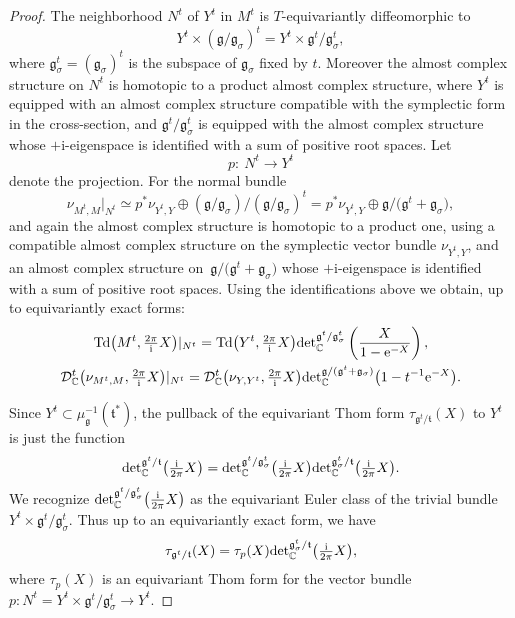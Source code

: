 \documentclass[pdftex]{sigma}
\numberwithin{equation}{section}
\newcommand{\tn}[1]{\textnormal{#1}}
\renewcommand{\i}{{\mathrm{i}}}
\def\g{\ensuremath{\mathfrak{g}}}
\def\t{\ensuremath{\mathfrak{t}}}
\def\bC{\ensuremath{\mathbb{C}}}
\def\Td{\ensuremath{\textnormal{Td}}}
\def\calDC{\ensuremath{\mathcal{D}_{\bC}}}
\def\de{\ensuremath{\tn{det}_\bC}}
\begin{document}
\begin{proof}The neighborhood $N^t$ of $Y^t$ in $M^t$ is $T$-equivariantly diffeomorphic to
\[ Y^t \times (\g/\g_\sigma)^t=Y^t\times \g^t/\g_\sigma^t,\]
where $\g_\sigma^t=(\g_\sigma)^t$ is the subspace of $\g_\sigma$ fixed by $t$. Moreover the almost complex structure on $N^t$ is homotopic to a product almost complex structure, where $Y^t$ is equipped with an almost complex structure compatible with the symplectic form in the cross-section, and $\g^t/\g_\sigma^t$ is equipped with the almost complex structure whose $+\i$-eigenspace is identified with a sum of positive root spaces. Let
\[ p\colon \ N^t \rightarrow Y^t \]
denote the projection. For the normal bundle
\[ \nu_{M^t,M}|_{N^t} \simeq p^\ast \nu_{Y^t,Y}\oplus (\g/\g_\sigma)/(\g/\g_\sigma)^t=p^\ast \nu_{Y^t,Y}\oplus\g/\big(\g^t+\g_\sigma\big),\]
and again the almost complex structure is homotopic to a product one, using a compatible almost complex structure on the symplectic vector bundle $\nu_{Y^t,Y}$, and an almost complex structure on~$\g/\big(\g^t+\g_\sigma\big)$ whose $+\i$-eigenspace is identified with a sum of positive root spaces. Using the identifications above we obtain, up to equivariantly exact forms:
\begin{gather}\label{eqn:dec}
\Td\big(M^t,\tfrac{2\pi}{\i}X\big)|_{N^t} =\Td\big(Y^t,\tfrac{2\pi}{\i}X\big)\tn{det}_{\bC}^{\g^t/\g_\sigma^t}\left(\frac{X}{1-{\rm e}^{-X}}\right),\\ \nonumber
\calDC^t\big(\nu_{M^t,M},\tfrac{2\pi}{\i}X\big)|_{N^t} =\calDC^t\big(\nu_{Y,Y^t},\tfrac{2\pi}{\i}X\big)\tn{det}_{\bC}^{\g/(\g^t+\g_\sigma)}\big(1-t^{-1}{\rm e}^{-X}\big).
\end{gather}

Since $Y^t \subset \mu_\g^{-1}(\t^\ast)$, the pullback of the equivariant Thom form $\tau_{\g^t/\t}(X)$ to $Y^t$ is just the function
\[ \de^{\g^t/\t}\big(\tfrac{\i}{2\pi}X\big)=\de^{\g^t/\g_\sigma^t}\big(\tfrac{\i}{2\pi}X\big)\de^{\g_\sigma^t/\t}\big(\tfrac{\i}{2\pi}X\big).\]
We recognize $\de^{\g^t/\g_\sigma^t}\big(\tfrac{\i}{2\pi}X\big)$ as the equivariant Euler class of the trivial bundle $Y^t \times \g^t/\g_\sigma^t$. Thus up to an equivariantly exact form, we have{\samepage
\begin{gather}\label{eqn:dec2}
\tau_{\g^t/\t}(X)=\tau_p(X)\de^{\g_\sigma^t/\t}\big(\tfrac{\i}{2\pi}X\big),
\end{gather}
where $\tau_p(X)$ is an equivariant Thom form for the vector bundle $p\colon N^t=Y^t\times \g^t/\g_\sigma^t\rightarrow Y^t$.}


\end{proof}
\end{document}

